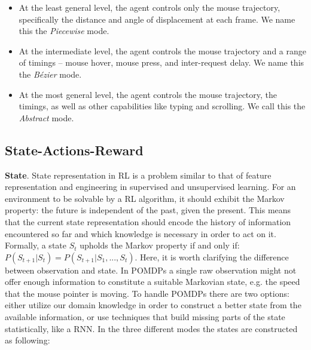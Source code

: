 \begin{itemize}
  \item At the least general level, the agent controls only the mouse trajectory, specifically the distance and angle of displacement at each frame. We name this the \emph{Piecewise} mode.
  \item At the intermediate level, the agent controls the mouse trajectory and a range of timings -- mouse hover, mouse press, and inter-request delay. We name this the \emph{Bézier} mode.
  \item At the most general level, the agent controls the mouse trajectory, the timings, as well as other capabilities like typing and scrolling. We call this the \emph{Abstract} mode.
 \end{itemize}

\subsection{State-Actions-Reward}

\textbf{State}. State representation in \gls{RL} is a problem similar to that of feature representation and engineering in supervised and unsupervised learning.
For an environment to be solvable by a \gls{RL} algorithm, it should exhibit the Markov property: the future is independent of the past, given the present.
This means that the current state representation should encode the history of information encountered so far and which knowledge is necessary in order to act on it.
Formally, a state $S_t$ upholds the Markov property if and only if: $P(S_{t+1} | S_t) = P(S_{t+1} | S_1,..., S_t)$.
Here, it is worth clarifying the difference between observation and state.
In POMDPs a single raw observation might not offer enough information to constitute a suitable Markovian state, e.g. the speed that the mouse pointer is moving.
To handle POMDPs there are two options: either utilize our domain knowledge in order to construct a better state from the available information, or use techniques that build missing parts of the state statistically, like a \gls{RNN}.
In the three different modes the states are constructed as following:

